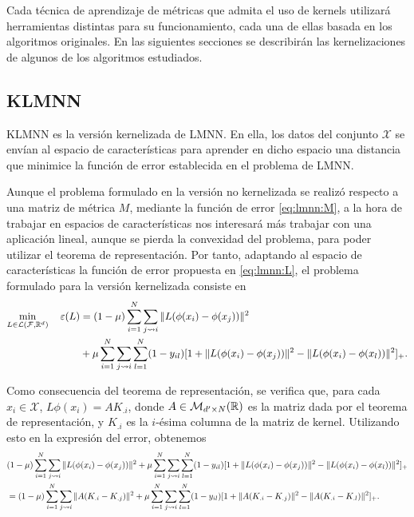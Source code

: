 Cada técnica de aprendizaje de métricas que admita el uso de kernels utilizará herramientas distintas para su funcionamiento, cada una de ellas basada en los algoritmos originales. En las siguientes secciones se describirán las kernelizaciones de algunos de los algoritmos estudiados.


\subsection{KLMNN}

KLMNN \cite{klmnn} es la versión kernelizada de LMNN. En ella, los datos del conjunto $\mathcal{X}$ se envían al espacio de características para aprender en dicho espacio una distancia que minimice la función de error establecida en el problema de LMNN.

Aunque el problema formulado en la versión no kernelizada se realizó respecto a una matriz de métrica $M$, mediante la función de error \ref{eq:lmnn:M}, a la hora de trabajar en espacios de características nos interesará más trabajar con una aplicación lineal, aunque se pierda la convexidad del problema, para poder utilizar el teorema de representación. Por tanto, adaptando al espacio de características la función de error propuesta en \ref{eq:lmnn:L}, el problema formulado para la versión kernelizada consiste en
\begin{equation} \label{eq:klmnn:L}
\begin{split}
    \min_{L\in \mathcal{L}(\mathcal{F},\mathbb{R}^{d})} \quad \varepsilon(L) &= (1-\mu)\sum_{i=1}^N\sum_{j \rightsquigarrow i} \|L(\phi(x_i) - \phi(x_j))\|^2 \\
                &+ \mu \sum_{i=1}^N\sum_{j \rightsquigarrow i} \sum_{l=1}^N(1-y_{il})[1 + \|L(\phi(x_i) - \phi(x_j))\|^2-\|L(\phi(x_i) - \phi(x_l))\|^2]_+. 
 \end{split}
\end{equation}

Como consecuencia del teorema de representación, se verifica que, para cada $x_i \in \mathcal{X}$, $L\phi(x_i) = AK_{.i}$, donde $A \in \mathcal{M}_{d' \times N}(\mathbb{R})$ es la matriz dada por el teorema de representación, y $K_{.i}$ es la $i$-ésima columna de la matriz de kernel. Utilizando esto en la expresión del error, obtenemos
\begin{align*}
& (1-\mu)\sum_{i=1}^N\sum_{j \rightsquigarrow i} \|L(\phi(x_i) - \phi(x_j))\|^2 
                + \mu \sum_{i=1}^N\sum_{j \rightsquigarrow i} \sum_{l=1}^N(1-y_{il})[1 + \|L(\phi(x_i) - \phi(x_j))\|^2-\|L(\phi(x_i) - \phi(x_l))\|^2]_+ \\
&= (1-\mu)\sum_{i=1}^N\sum_{j \rightsquigarrow i} \|A(K_{.i} - K_{.j})\|^2 
                + \mu \sum_{i=1}^N\sum_{j \rightsquigarrow i} \sum_{l=1}^N(1-y_{il})[1 + \|A(K_{.i} - K_{.j})\|^2-\|A(K_{.i} - K_{.l})\|^2]_+.
 \end{align*}

